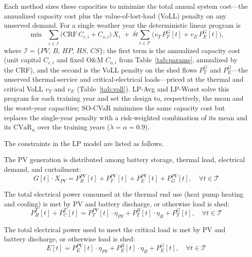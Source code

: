 \documentclass[11pt]{article}
\begin{document}
Each method sizes these capacities to minimize the total annual system cost---the annualized
capacity cost plus the value-of-lost-load (VoLL) penalty on any unserved demand. For a single
weather year the deterministic linear program is
\begin{equation}
\min \;\; \sum_{i \in \mathcal{I}} \bigl(\mathrm{CRF}\, C_{c,i} + C_{o,i}\bigr)\, X_i
\;+\; \delta t \sum_{t \in \mathcal{T}} \bigl(v_T\, P^{G}_{T}[t] + v_E\, P^{G}_{E}[t]\bigr),
\label{eq:objective}
\end{equation}
where $\mathcal{I}=\{PV,\,B,\,HP,\,HS,\,CS\}$; the first term is the annualized capacity cost (unit
capital $C_{c,i}$ and fixed O\&M $C_{o,i}$ from Table~\ref{tab:params}, annualized by the CRF), and
the second is the VoLL penalty on the shed flows $P^{G}_{T}$ and $P^{G}_{E}$---the unserved
thermal-service and critical-electrical loads---priced at the thermal and critical VoLL $v_T$ and
$v_E$ (Table~\ref{tab:voll}). LP-Avg and LP-Worst solve this program for each training year and set
the design to, respectively, the mean and the worst-year capacities; SO-CVaR minimizes the same
capacity cost but replaces the single-year penalty with a risk-weighted combination of its mean and
its $\mathrm{CVaR}_{\alpha}$ over the training years ($\lambda=\alpha=0.9$).

The constraints in the LP model are listed as follows.

The PV generation is distributed among battery storage, thermal load, electrical demand, and curtailment:
\begin{equation}
G[t] \cdot X_{PV} = P^{PV}_B[t] + P^{PV}_T[t] + P^{PV}_E[t] + P^{PV}_G[t], \quad \forall t \in \mathcal{T}
\label{eq:pv_balance}
\end{equation}

The total electrical power consumed at the thermal end use (heat pump heating and cooling) is met by PV and battery discharge, or otherwise load is shed:
\begin{equation}
P^{T}_{H}[t] + P^{T}_{C}[t] =  P^{PV}_T[t] \cdot \eta_{PV} + P^{B}_T[t] \cdot \eta_{B} + P^{G}_T[t], \quad \forall t \in \mathcal{T} \label{eq:heating_elec}
\end{equation}

The total electrical power used to meet the critical load is met by PV and battery discharge, or otherwise load is shed:
\begin{equation}
E[t] = P^{PV}_E[t] \cdot \eta_{PV} + P^{B}_E[t] \cdot \eta_{B} + P^{G}_E[t], \quad \forall t \in \mathcal{T} \label{eq:crit_load}
\end{equation}
\end{document}
